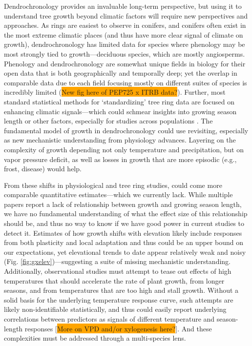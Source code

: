 \documentclass[11pt]{article}
\begin{document}
Dendrochronology provides an invaluable long-term perspective, but using it to understand tree growth beyond climatic factors will require new perspectives and approaches. As rings are easiest to observe in conifers, and conifers often exist in the most extreme climatic places (and thus have more clear signal of climate on growth), dendrochronology has limited data for species where phenology may be most strongly tied to growth---deciduous species, which are mostly angiosperms. Phenology and dendrochronology are somewhat unique fields in biology for their open data that is both geographically and temporally deep; yet the overlap in comparable data due to each field focusing mostly on different suites of species is incredibly limited (\colorbox{orange}{New fig here of PEP725 x ITRB data?}). Further, most standard statistical methods for `standardizing' tree ring data are focused on enhancing climatic signals---which could schmear insights into growing season length or other factors, especially for studies across populations \citep{de2022temperature}. The fundamental model of growth in dendrochronology could use revisiting, especially as new mechanistic understanding from physiology advances. Layering on the complexity of growth depending not only temperature and precipitation, but on vapor pressure deficit, as well as losses in growth that are more episodic (e.g., frost, disease) would help.

From these shifts in physiological and tree ring studies, could come more comparable quantitative estimates---which we currently lack. While multiple papers report a lack of relationship between growth and growing season length, we have no fundamental understanding of what the effect size of this relationship should be, and thus no way to know if we have good power in current studies to detect it. Estimates of how growth shifts with elevation likely include responses from both plasticity and local adaptation and thus could be an upper bound on our expectations, yet elevational trends to date appear relatively weak and noisy (Fig. \ref{fig:gxelev})---suggesting a suite of missing mechanistic understanding. Additionally, observational studies must attempt to tease out effects of high temperatures that should accelerate the rate of plant growth, from longer seasons, and from temperatures that are too high and stall growth. Without a solid basis for the underlying temperature response curve, such attempts are likely non-identifiable statistically, and thus could easily report underlying correlations between predictors as signals of different temperature and season-length responses [\colorbox{orange}{More on VPD and/or xylogenesis here?}]. And these complexities must be addressed through a multi-species lens.
\end{document}
